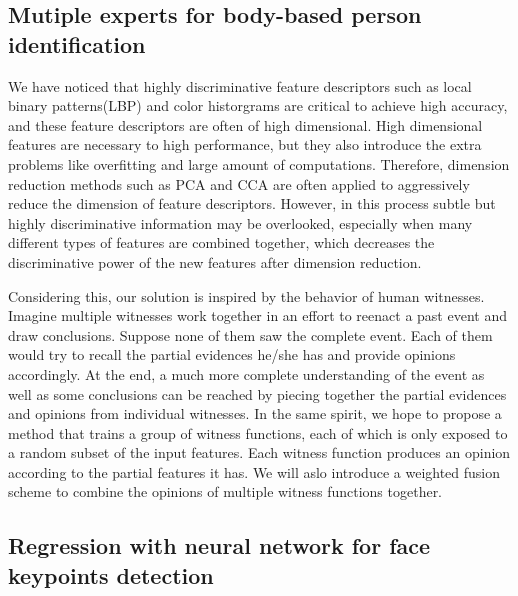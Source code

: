 \documentclass[pdftex,12pt,a4paper]{report}
\begin{document}
\subsection{Mutiple experts for body-based person identification}
We have noticed that highly discriminative feature descriptors such as local
binary patterns(LBP) and color historgrams are critical to achieve high
accuracy, and these feature descriptors are often of high dimensional. High 
dimensional features are necessary to high performance, but they also introduce
the extra problems like overfitting and large amount of computations. Therefore,
dimension reduction methods such as PCA and CCA are often applied to 
aggressively reduce the dimension of feature descriptors. However, in this 
process subtle but highly discriminative information may be overlooked, 
especially when many different types of features are combined together, which 
decreases the discriminative power of the new features after dimension reduction.

Considering this, our solution is inspired by the behavior of human witnesses. 
Imagine multiple witnesses work together in an effort to reenact a past event 
and draw conclusions. Suppose none of them saw the complete event. Each of them 
would try to recall the partial evidences he/she has and provide opinions 
accordingly. At the end, a much more complete understanding of the event as 
well as some conclusions can be reached by piecing together the partial 
evidences and opinions from individual witnesses. In the same spirit, we 
hope to propose a method that trains a group of witness functions, 
each of which is only exposed to a random subset of the input features. Each 
witness function produces an opinion according to the partial features it has. 
We will aslo introduce a weighted fusion scheme to combine the opinions of multiple 
witness functions together.

\subsection{Regression with neural network for face keypoints detection}
\end{document}
